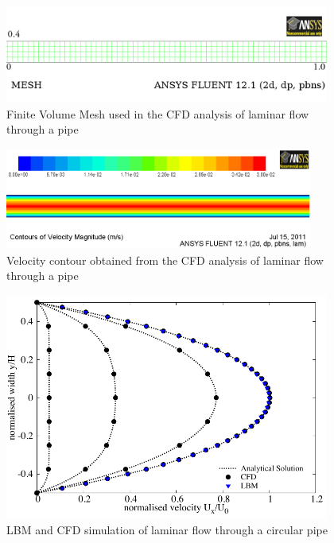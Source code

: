 \begin{figure}[h]
\centering
\includegraphics[width=0.95\textwidth]{CFD_Mesh}
\caption{Finite Volume Mesh used in the CFD analysis of laminar flow through a 
pipe}
\label{fig:mesh}
\end{figure}


\begin{figure}[h]
\centering
\includegraphics[width=0.9\textwidth]{CFD_Poiseuille}
\caption{Velocity contour obtained from the CFD analysis of laminar flow 
through a pipe}
\label{fig:cont}
\end{figure}


\begin{figure}[h]
\centering
\includegraphics[width=0.95\textwidth]{Poiseuille}
\caption{LBM and CFD simulation of laminar flow through a circular pipe}
\label{fig:LBM}
\end{figure}

